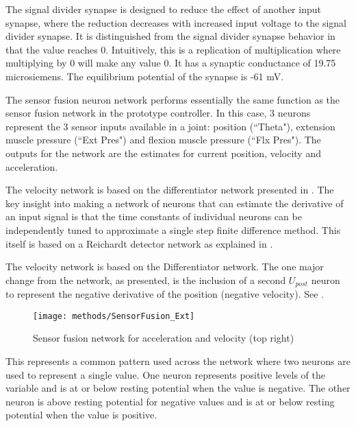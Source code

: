 
The signal divider synapse is designed to reduce the effect of another input
synapse, where the reduction decreases with increased input voltage to the
signal divider synapse. It is distinguished from the signal divider synapse
behavior in that the value reaches 0. Intuitively, this is a replication of 
multiplication where multiplying by 0 will make any value 0.
It has a synaptic conductance of 19.75 microsiemens. The equilibrium potential 
of the synapse is -61 mV.


The sensor fusion neuron network performs essentially the same function as the
sensor fusion network in the prototype controller. In this case, 3 neurons
represent the 3 sensor inputs available in a joint: position (``Theta"),
extension muscle pressure (``Ext Pres") and flexion muscle pressure
(``Flx Pres"). The outputs for the network are the estimates for current 
position, velocity and acceleration.



The velocity network is based on the differentiator network presented in 
\cite{NickFunctionalSubnetwork}. The key insight into making a network
of neurons that can estimate the derivative of an input signal is that
the time constants of individual neurons can be independently tuned to 
approximate a single step finite difference method. This itself is based
on a Reichardt detector network as explained in
\cite{NickFunctionalSubnetwork}.


The velocity network is based on the Differentiator network. 
The one major change from the network,
as presented, is the inclusion of a second $U_{post}$ neuron to 
represent the negative derivative of the position (negative velocity). See .

\begin{figure}
\centering
\texttt{[image: methods/SensorFusion\_Ext]}
\caption{Sensor fusion network for acceleration and velocity (top right)}
\label{fig:SensorFusion}
\end{figure}

This represents
a common pattern used across the network where two neurons are used to represent
a single value. One neuron represents positive levels of the variable and is 
at or below resting potential when the value is negative. The other neuron is
above resting potential for negative values and is at or below resting potential
when the value is positive. 

